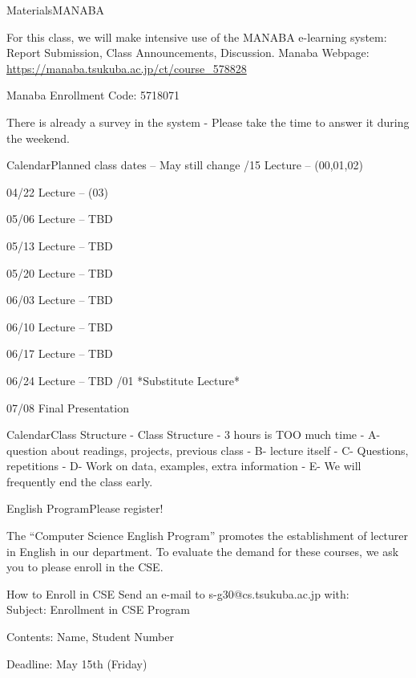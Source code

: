 \documentclass[t]{beamer}
\begin{document}
\begin{ftst}
{Materials}{MANABA}

For this class, we will make intensive use of the MANABA e-learning
system: Report Submission, Class Announcements, Discussion.
\vone
\bitems Manaba Webpage: \url{https://manaba.tsukuba.ac.jp/ct/course_578828}
\item Manaba Enrollment Code: 5718071 
\eitem
\vone 

There is already a survey in the system - Please take the time to
answer it during the weekend.
\end{ftst}

\begin{ftst}
{Calendar}{Planned class dates -- May still change}
/15 Lecture -- (00,01,02)
\item 04/22 Lecture -- (03)
\item 05/06 Lecture -- TBD
\item 05/13 Lecture -- TBD
\item 05/20 Lecture -- TBD
\item 06/03 Lecture -- TBD
\item 06/10 Lecture -- TBD
\item 06/17 Lecture -- TBD
\item 06/24 Lecture -- TBD
/01 *Substitute Lecture*
\item 07/08 Final Presentation
\eitem
\end{ftst}

\begin{ftst}
{Calendar}{Class Structure}
- Class Structure
  - 3 hours is TOO much time
  - A- question about readings, projects, previous class
  - B- lecture itself
  - C- Questions, repetitions
  - D- Work on data, examples, extra information
  - E- We will frequently end the class early.
\end{ftst}

\begin{ftst}
{English Program}{Please register!}

The ``Computer Science English Program'' promotes the establishment of
lecturer in English in our department. To evaluate the demand for these 
courses, we ask you to please enroll in the CSE.
\vone
\begin{block}{How to Enroll in CSE}
Send an e-mail to \alert{s-g30@cs.tsukuba.ac.jp} with:\\
\vone
\bitems Subject: Enrollment in CSE Program
\item Contents: Name, Student Number
\eitem
\end{block}
\vone
\begin{center}
  Deadline: May 15th (Friday)
\end{center}
\end{ftst}
\end{document}
